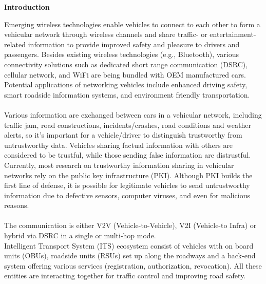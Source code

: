\documentclass[a4paper,14pt]{extarticle}
\begin{document}
\newpage
\begin{center}
    {\LARGE \textbf{Introduction}} \\
    \vspace{1cm}
\end{center}
Emerging wireless technologies enable vehicles to connect
to each other to form a vehicular network through wireless
channels and share traffic- or entertainment-related information to provide improved safety and pleasure to drivers and
passengers. Besides existing wireless technologies (e.g., Bluetooth), various connectivity solutions such as dedicated short
range communication (DSRC), cellular network, and WiFi
are being bundled with OEM manufactured cars. Potential
applications of networking vehicles include enhanced driving
safety, smart roadside information systems, and environment friendly transportation.
\\
\\
Various information are exchanged between cars in a vehicular network, including traffic jam, road constructions,
incidents/crashes, road conditions and weather alerts, so it’s
important for a vehicle/driver to distinguish trustworthy from
untrustworthy data. Vehicles sharing factual information with
others are considered to be trustful, while those sending
false information are distrustful. Currently, most research on
trustworthy information sharing in vehicular networks rely on
the public key infrastructure (PKI). Although PKI builds the
first line of defense, it is possible for legitimate vehicles to
send untrustworthy information due to defective sensors, computer viruses, and even for malicious reasons.
\\
\\
The communication is either V2V (Vehicle-to-Vehicle), V2I (Vehicle-to Infra) or hybrid via DSRC in a single or multi-hop
mode.
\\
Intelligent Transport System (ITS) ecosystem consist of vehicles with on board units (OBUs), roadside units (RSUs) set up along the roadways and a back-end system offering various services (registration, authorization,
revocation). All these entities are interacting together for traffic control and improving road safety.
\end{document}
